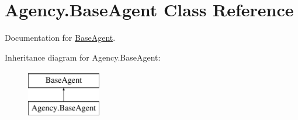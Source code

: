 \hypertarget{classAgency_1_1BaseAgent}{}\section{Agency.\+Base\+Agent Class Reference}
\label{classAgency_1_1BaseAgent}


Documentation for \mbox{\hyperlink{classAgency_1_1BaseAgent}{Base\+Agent}}.  


Inheritance diagram for Agency.\+Base\+Agent\+:\begin{figure}[H]
\begin{center}
\leavevmode
\includegraphics[height=2.000000cm]{classAgency_1_1BaseAgent}
\end{center}
\end{figure}
